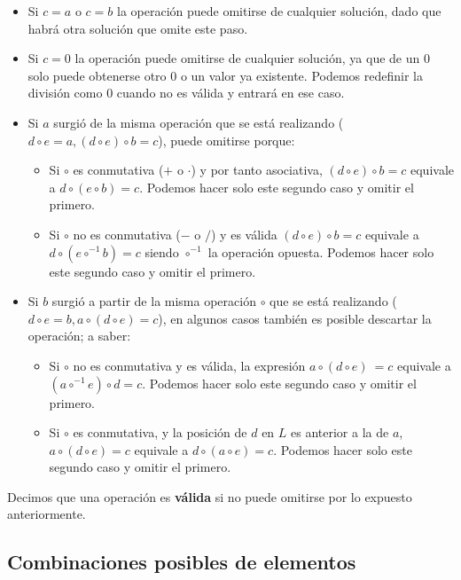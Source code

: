 \begin{itemize}
	\item Si $c = a$ o $c = b$ la operación puede omitirse de cualquier solución,
	dado que habrá otra solución que omite este paso.
	\item Si $c = 0$ la operación puede omitirse de cualquier solución, ya que de
	un 0 solo puede obtenerse otro 0 o un valor ya existente. Podemos redefinir
	la división como 0 cuando no es válida y entrará en ese caso.
	\item Si $a$ surgió de la misma operación que se está realizando
  ($d \circ e = a, (d \circ e) \circ b = c$),
  puede omitirse porque:
	\begin{itemize}
		\item Si $\circ$ es conmutativa ($+$ o $\cdot$) y por tanto asociativa,
		$(d \circ e) \circ b = c$ equivale a $d \circ (e \circ b) = c$.
		Podemos hacer solo este segundo caso y omitir el primero.
		\item Si $\circ$ no es conmutativa ($-$ o $/$) y es válida
		$(d \circ e) \circ b = c$ equivale a $d \circ (e \circ^{-1} b) = c$
		siendo $\circ^{-1}$ la operación opuesta. Podemos hacer solo este segundo caso y omitir el primero.
	\end{itemize}
	\item Si $b$ surgió a partir de la misma operación $\circ$ que se está realizando
	($d \circ e = b, a \circ (d \circ e) = c$),
	en algunos casos también es posible descartar la operación; a saber:
	\begin{itemize}
		\item Si $\circ$ no es conmutativa y es válida, la expresión
		$a \circ (d \circ e)\ = c$ equivale a $(a \circ^{-1} e) \circ d = c$.
		Podemos hacer solo este segundo caso y omitir el primero.
		\item Si $\circ$ es conmutativa, y la posición de $d$ en $L$ es anterior a la de $a$, $a \circ (d \circ e) = c$	equivale a $d \circ (a \circ e) = c$.
		Podemos hacer solo este segundo caso y omitir el primero.
	\end{itemize}
\end{itemize}

Decimos que una operación es \textbf{válida} si no puede omitirse por lo
expuesto anteriormente.

\subsection{Combinaciones posibles de elementos}

